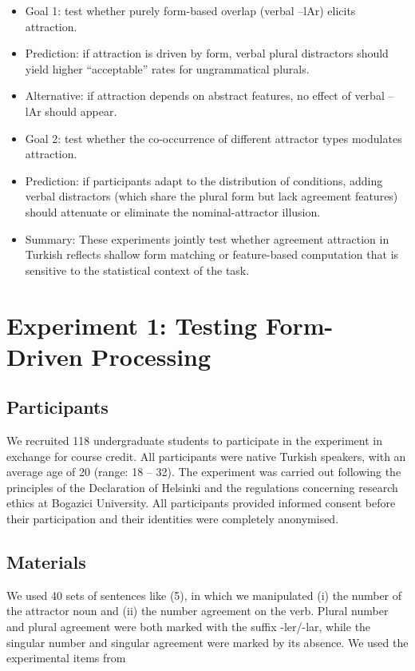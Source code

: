 \documentclass[
  authoryear,
  preprint]{elsarticle}
\begin{document}
\begin{itemize}
\item
  Goal 1: test whether purely form-based overlap (verbal --lAr) elicits
  attraction.
\item
  Prediction: if attraction is driven by form, verbal plural distractors
  should yield higher ``acceptable'' rates for ungrammatical plurals.
\item
  Alternative: if attraction depends on abstract features, no effect of
  verbal --lAr should appear.
\item
  Goal 2: test whether the co-occurrence of different attractor types
  modulates attraction.
\item
  Prediction: if participants adapt to the distribution of conditions,
  adding verbal distractors (which share the plural form but lack
  agreement features) should attenuate or eliminate the
  nominal-attractor illusion.
\item
  Summary: These experiments jointly test whether agreement attraction
  in Turkish reflects shallow form matching or feature-based computation
  that is sensitive to the statistical context of the task.
\end{itemize}

\section{Experiment 1: Testing Form-Driven
Processing}\label{experiment-1-testing-form-driven-processing}

\subsection{Participants}\label{participants}

We recruited 118 undergraduate students to participate in the experiment
in exchange for course credit. All participants were native Turkish
speakers, with an average age of 20 (range: 18 -- 32). The experiment
was carried out following the principles of the Declaration of Helsinki
and the regulations concerning research ethics at Bogazici University.
All participants provided informed consent before their participation
and their identities were completely anonymised.

\subsection{Materials}\label{materials}

We used 40 sets of sentences like (5), in which we manipulated (i) the
number of the attractor noun and (ii) the number agreement on the verb.
Plural number and plural agreement were both marked with the suffix
-ler/-lar, while the singular number and singular agreement were marked
by its absence. We used the experimental items from
\end{document}
